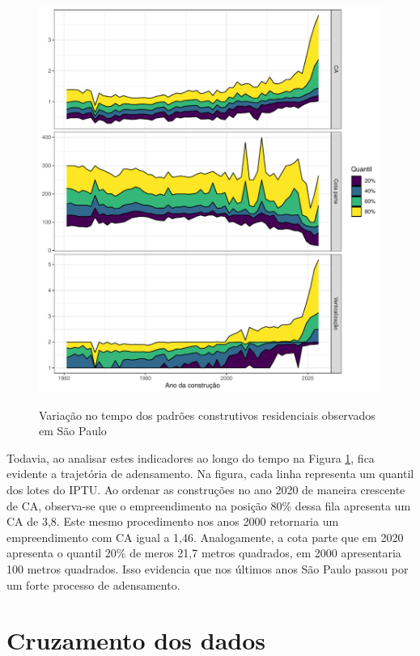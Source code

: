 \begin{figure}[h]
    \centering
    \caption{Variação no tempo dos padrões construtivos residenciais observados em São Paulo}
    \includegraphics[width = \linewidth]{imagens/indicadores_tempo.pdf}
    \label{fig:indicadores-tempo}
\end{figure}

Todavia, ao analisar estes indicadores ao longo do tempo na Figura \ref{fig:indicadores-tempo}, fica evidente a trajetória de adensamento. Na figura, cada linha representa um quantil dos lotes do IPTU. Ao ordenar as construções no ano 2020 de maneira crescente de CA, observa-se que o empreendimento na posição 80\% dessa fila apresenta um CA de 3,8. Este mesmo procedimento nos anos 2000 retornaria um empreendimento com CA igual a 1,46. Analogamente, a cota parte que em 2020 apresenta o quantil 20\% de meros 21,7 metros quadrados, em 2000 apresentaria 100 metros quadrados. Isso evidencia que nos últimos anos São Paulo passou por um forte processo de adensamento.

\section{Cruzamento dos dados}

